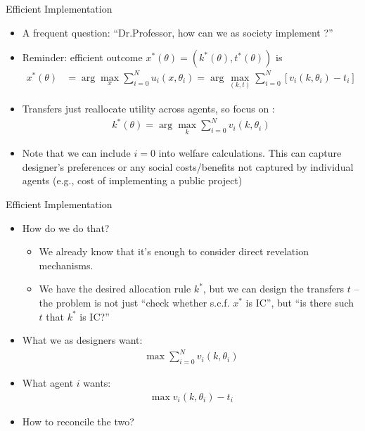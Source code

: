 \documentclass[english,10pt
,aspectratio=169
,handout
]{beamer}
\begin{document}
\begin{frame}{Efficient Implementation}
\begin{itemize}
	\item A frequent question: ``Dr.Professor, how can we as society implement ?''
	\item Reminder: efficient outcome $x^*(\theta) = (k^*(\theta),t^*(\theta))$ is 
	\vspace{-0.5em}\begin{align*}
	x^*(\theta) &= \arg \max_x \sum_{i=0}^N u_i(x,\theta_i) 
	= \arg \max_{(k,t)} \sum_{i=0}^N \left[v_i(k,\theta_i) - t_i\right]
	\end{align*}
	\item Transfers just reallocate utility across agents, so focus on :
	\vspace{-1em}\begin{align*}
	k^*(\theta) = \arg \max_k \sum_{i=0}^N v_i(k,\theta_i)
	\end{align*}
	\item Note that we can include $i=0$ into welfare calculations. This can capture designer's preferences or any social costs/benefits not captured by individual agents (e.g., cost of implementing a public project)
\end{itemize}
\end{frame}


\begin{frame}{Efficient Implementation}
\begin{itemize}
	\item How do we do that?
	\begin{itemize}
		\item We already know that it's enough to consider direct revelation mechanisms.
		\item We have the desired allocation rule $k^*$, but we can design the transfers $t$ -- the problem is not just ``check whether s.c.f. $x^*$ is IC'', but ``is there such $t$ that $k^*$ is IC?''
	\end{itemize}
	\item What we as designers want:
	\vspace{-1em}\begin{align*}
	\max \sum_{i=0}^N v_i(k,\theta_i)
	\end{align*}
	\item What agent $i$ wants:
	\vspace{-1em}\begin{align*}
	\max v_i(k,\theta_i) - t_i
	\end{align*}
	\item How to reconcile the two?
\end{itemize}
\end{frame}
\end{document}
